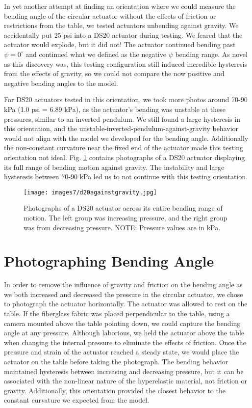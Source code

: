 In yet another attempt at finding an orientation where we could measure the bending angle of the circular actuator without the effects of friction or restrictions from the table, we tested actuators unbending against gravity. We accidentally put 25 psi into a DS20 actuator during testing. We feared that the actuator would explode, but it did not! The actuator continued bending past $\psi=0^\circ$ and continued what we defined as the negative $\psi$ bending range. As novel as this discovery was, this testing configuration still induced incredible hysteresis from the effects of gravity, so we could not compare the now positive and negative bending angles to the model. 

For DS20 actuators tested in this orientation, we took more photos around 70-90 kPa (1.0 psi = 6.89 kPa), as the actuator's bending was unstable at these pressures, similar to an inverted pendulum. We still found a large hysteresis in this orientation, and the unstable-inverted-pendulum-against-gravity behavior would not align with the model we developed for the bending angle. Additionally the non-constant curvature near the fixed end of the actuator made this testing orientation not ideal. Fig. \ref{fig:d20againstgravity} contains photographs of a DS20 actuator displaying its full range of bending motion against gravity. The instability and large hysteresis between 70-90 kPa led us to not continue with this testing orientation. 

\begin{figure}[ht]
    \centering
     \texttt{[image: images7/d20againstgravity.jpg]}
    \caption{Photographs of a DS20 actuator across its entire bending range of motion. The left group was increasing pressure, and the right group was from decreasing pressure. NOTE: Pressure values are in kPa.}
    \label{fig:d20againstgravity}
\end{figure}

\clearpage
\section{Photographing Bending Angle}

In order to remove the influence of gravity and friction on the bending angle as we both increased and decreased the pressure in the circular actuator, we chose to photograph the actuator horizontally. The actuator was allowed to rest on the table. If the fiberglass fabric was placed perpendicular to the table, using a camera mounted above the table pointing down, we could capture the bending angle at any pressure. Although laborious, we held the actuator above the table when changing the internal pressure to eliminate the effects of friction. Once the pressure and strain of the actuator reached a steady state, we would place the actuator on the table before taking the photograph. The bending behavior maintained hysteresis between increasing and decreasing pressure, but it can be associated with the non-linear nature of the hyperelastic material, not friction or gravity. Additionally, this orientation provided the closest behavior to the constant curvature we expected from the model. 

